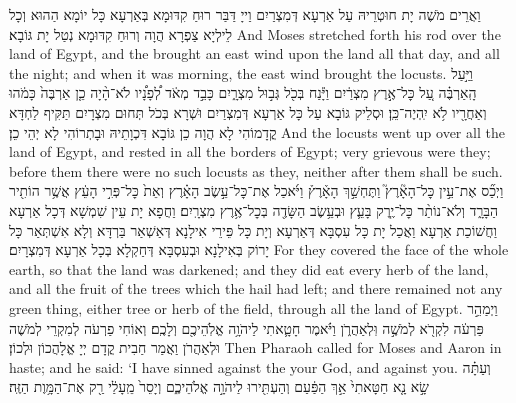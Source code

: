 {וַאֲרֵים מֹשֶׁה יָת חוּטְרֵיהּ עַל אַרְעָא דְּמִצְרַיִם וַייָ דַּבַּר רוּחַ קִדּוּמָא בְּאַרְעָא כָּל יוֹמָא הַהוּא וְכָל לֵילְיָא צַפְרָא הֲוָה וְרוּחַ קִדּוּמָא נְטַל יָת גּוֹבָא׃}
{And Moses stretched forth his rod over the land of Egypt, and the \lord\space brought an east wind upon the land all that day, and all the night; and when it was morning, the east wind brought the locusts.}{}
{וַיַּ֣עַל הָֽאַרְבֶּ֗ה עַ֚ל כׇּל־אֶ֣רֶץ מִצְרַ֔יִם וַיָּ֕נַח בְּכֹ֖ל גְּב֣וּל מִצְרָ֑יִם כָּבֵ֣ד מְאֹ֔ד לְ֠פָנָ֠יו לֹא־הָ֨יָה כֵ֤ן אַרְבֶּה֙ כָּמֹ֔הוּ וְאַחֲרָ֖יו לֹ֥א יִֽהְיֶה־כֵּֽן׃
}
{וּסְלֵיק גּוֹבָא עַל כָּל אַרְעָא דְּמִצְרַיִם וּשְׁרָא בְּכֹל תְּחוּם מִצְרָיִם תַּקִּיף לַחְדָּא קֳדָמוֹהִי לָא הֲוָה כֵן גּוֹבָא דִּכְוָתֵיהּ וּבָתְרוֹהִי לָא יְהֵי כֵן׃}
{And the locusts went up over all the land of Egypt, and rested in all the borders of Egypt; very grievous were they; before them there were no such locusts as they, neither after them shall be such.}{}
{וַיְכַ֞ס אֶת־עֵ֣ין כׇּל־הָאָ֘רֶץ֮ וַתֶּחְשַׁ֣ךְ הָאָ֒רֶץ֒ וַיֹּ֜אכַל אֶת־כׇּל־עֵ֣שֶׂב הָאָ֗רֶץ וְאֵת֙ כׇּל־פְּרִ֣י הָעֵ֔ץ אֲשֶׁ֥ר הוֹתִ֖יר הַבָּרָ֑ד וְלֹא־נוֹתַ֨ר כׇּל־יֶ֧רֶק בָּעֵ֛ץ וּבְעֵ֥שֶׂב הַשָּׂדֶ֖ה בְּכׇל־אֶ֥רֶץ מִצְרָֽיִם׃
}
{וַחֲפָא יָת עֵין שִׁמְשָׁא דְּכָל אַרְעָא וַחֲשׁוֹכַת אַרְעָא וַאֲכַל יָת כָּל עִסְבָּא דְּאַרְעָא וְיָת כָּל פֵּירֵי אִילָנָא דְּאַשְׁאַר בַּרְדָּא וְלָא אִשְׁתְּאַר כָּל יָרוֹק בְּאִילָנָא וּבְעִסְבָּא דְּחַקְלָא בְּכָל אַרְעָא דְּמִצְרָיִם׃}
{For they covered the face of the whole earth, so that the land was darkened; and they did eat every herb of the land, and all the fruit of the trees which the hail had left; and there remained not any green thing, either tree or herb of the field, through all the land of Egypt.}{}
{וַיְמַהֵ֣ר פַּרְעֹ֔ה לִקְרֹ֖א לְמֹשֶׁ֣ה וּֽלְאַהֲרֹ֑ן וַיֹּ֗אמֶר חָטָ֛אתִי לַיהֹוָ֥ה אֱלֹֽהֵיכֶ֖ם וְלָכֶֽם׃}
{וְאוֹחִי פַרְעֹה לְמִקְרֵי לְמֹשֶׁה וּלְאַהֲרֹן וַאֲמַר חַבִית קֳדָם יְיָ אֱלָהֲכוֹן וּלְכוֹן׃}
{Then Pharaoh called for Moses and Aaron in haste; and he said: ‘I have sinned against the \lord\space your God, and against you.}{}
{וְעַתָּ֗ה שָׂ֣א נָ֤א חַטָּאתִי֙ אַ֣ךְ הַפַּ֔עַם וְהַעְתִּ֖ירוּ לַיהֹוָ֣ה אֱלֹהֵיכֶ֑ם וְיָסֵר֙ מֵֽעָלַ֔י רַ֖ק אֶת־הַמָּ֥וֶת הַזֶּֽה׃}
